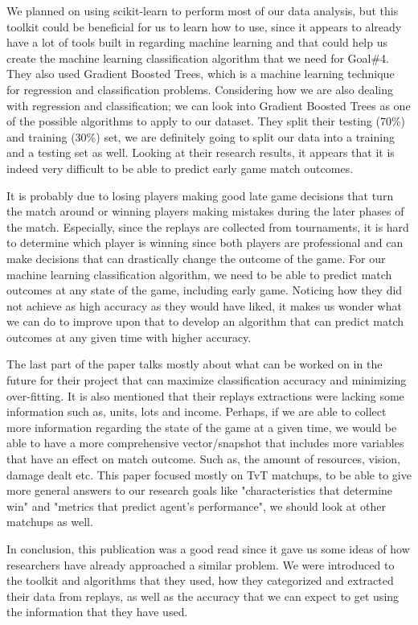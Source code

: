 \documentclass[a4paper,12pt]{report}
\begin{document}
We planned on using scikit-learn to perform most of our data analysis, but this toolkit could be beneficial for us to learn how to use, since it appears to already have a lot of tools built in regarding machine learning and that could help us create the machine learning classification algorithm that we need for Goal\#4. They also used Gradient Boosted Trees, which is a machine learning technique for regression and classification problems. Considering how we are also dealing with regression and classification; we can look into Gradient Boosted Trees as one of the possible algorithms to apply to our dataset. They split their testing (70\%) and training (30\%) set, we are definitely going to split our data into a training and a testing set as well. Looking at their research results, it appears that it is indeed very difficult to be able to predict early game match outcomes.

It is probably due to losing players making good late game decisions that turn the match around or winning players making mistakes during the later phases of the match. Especially, since the replays are collected from tournaments, it is hard to determine which player is winning since both players are professional and can make decisions that can drastically change the outcome of the game. For our machine learning classification algorithm, we need to be able to predict match outcomes at any state of the game, including early game. Noticing how they did not achieve as high accuracy as they would have liked, it makes us wonder what we can do to improve upon that to develop an algorithm that can predict match outcomes at any given time with higher accuracy.

The last part of the paper talks mostly about what can be worked on in the future for their project that can maximize classification accuracy and minimizing over-fitting. It is also mentioned that their replays extractions were lacking some information such as, units, lots and income.
Perhaps, if we are able to collect more information regarding the state of the game at a given time, we would be able to have a more comprehensive vector/snapshot that includes more variables that have an effect on match outcome. Such as, the amount of resources, vision, damage dealt etc. This paper focused mostly on TvT matchups, to be able to give more general answers to our research goals like "characteristics that determine win" and "metrics that predict agent’s performance", we should look at other matchups as well.

In conclusion, this publication was a good read since it gave us some ideas of how researchers have already approached a similar problem. We were introduced to the toolkit and algorithms that they used, how they categorized and extracted their data from replays, as well as the accuracy that we can expect to get using the information that they have used.
\end{document}
